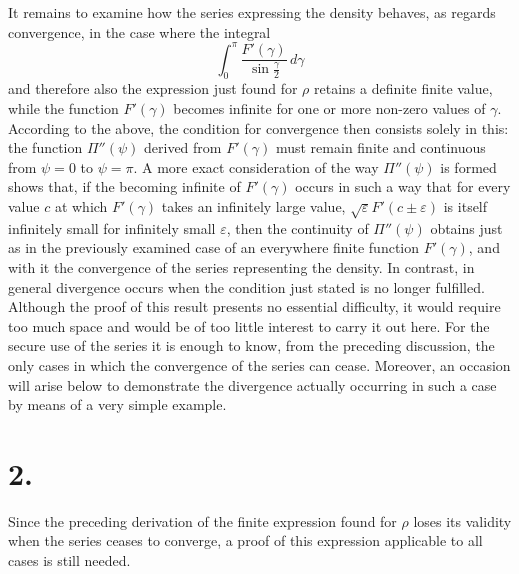 \documentclass[11pt]{article}
\newcommand{\dd}{\,d}
\begin{document}
It remains to examine how the series expressing the density behaves, as regards convergence, in the case where the integral
\[
 \int_0^\pi\frac{F'(\gamma)}{\sin\frac{\gamma}{2}}\dd\gamma
\]
and therefore also the expression just found for $\rho$ retains a definite finite value, while the function $F'(\gamma)$ becomes infinite for one or more non-zero values of $\gamma$. According to the above, the condition for convergence then consists solely in this: the function $\Pi''(\psi)$ derived from $F'(\gamma)$ must remain finite and continuous from $\psi=0$ to $\psi=\pi$. A more exact consideration of the way $\Pi''(\psi)$ is formed shows that, if the becoming infinite of $F'(\gamma)$ occurs in such a way that for every value $c$ at which $F'(\gamma)$ takes an infinitely large value, $\sqrt\varepsilon F'(c\pm\varepsilon)$ is itself infinitely small for infinitely small $\varepsilon$, then the continuity of $\Pi''(\psi)$ obtains just as in the previously examined case of an everywhere finite function $F'(\gamma)$, and with it the convergence of the series representing the density. In contrast, in general divergence occurs when the condition just stated is no longer fulfilled. Although the proof of this result presents no essential difficulty, it would require too much space and would be of too little interest to carry it out here. For the secure use of the series it is enough to know, from the preceding discussion, the only cases in which the convergence of the series can cease. Moreover, an occasion will arise below to demonstrate the divergence actually occurring in such a case by means of a very simple example.

\section*{2.}

Since the preceding derivation of the finite expression found for $\rho$ loses its validity when the series ceases to converge, a proof of this expression applicable to all cases is still needed.
\end{document}
